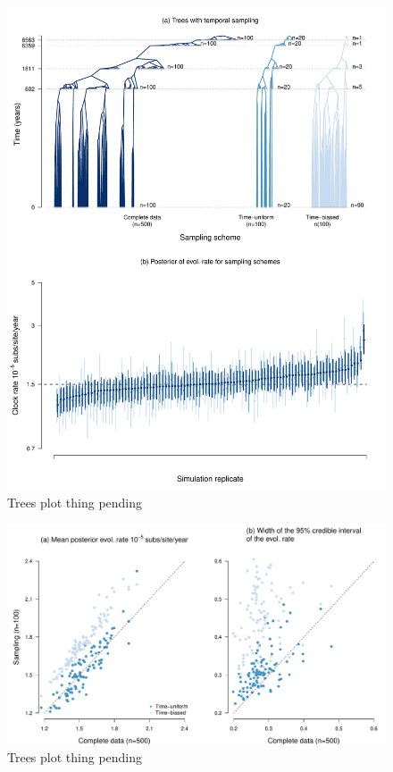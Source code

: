 \documentclass[11pt]{article}
\begin{document}
\begin{figure}[H]
	\begin{center}
		\includegraphics[scale=0.6, angle=0]{sampling_bias_summary_trees_rates.pdf}
		\caption{Trees plot thing pending}
		\label{figure:Fig4}
	\end{center}
\end{figure}


\begin{figure}[H]
	\begin{center}
		\includegraphics[scale=0.4, angle=0]{sampling_bias_summary_rates.pdf}
		\caption{Trees plot thing pending}
		\label{figure:Fig5}
	\end{center}
\end{figure}
\end{document}
